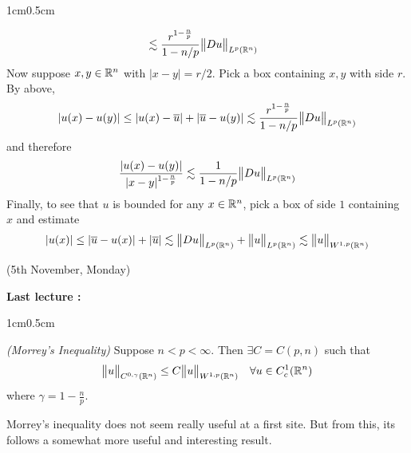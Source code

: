 \documentclass[12pt,a4paper]{report}
\newenvironment{proof}
{\begin{changemargin}{1cm}{0.5cm} 
	}%
	{\end{changemargin}
}
\begin{document}
\begin{proof}
\begin{align*}
&\lesssim \frac{r^{1-\frac{n}{p}}}{1-n/p} \bigl\lVert Du\bigr\rVert_{L^p(\mathbb{R}^n)}
\end{align*}
Now suppose $x,y\in \mathbb{R}^n$ with $|x-y| = r/2$. Pick a box containing $x,y$ with side $r$. By above,
\begin{align*}
|u(x) - u(y)| \leq |u(x)- \overline{u}| + |\overline{u} - u(y) | \lesssim \frac{r^{1-\frac{n}{p}}}{1-n/p} \bigl\lVert Du\bigr\rVert_{L^p(\mathbb{R}^n)}
\end{align*}
and therefore
\begin{align*}
\frac{|u(x)-u(y)|}{|x-y|^{1-\frac{n}{p}}} \lesssim \frac{1}{1-n/p} \bigl\lVert Du\bigr\rVert_{L^p(\mathbb{R}^n)}
\end{align*}
Finally, to see that $u$ is bounded for any $x\in \mathbb{R}^n$, pick a box of side $1$ containing $x$ and estimate
\begin{align*}
|u(x)| \leq |\overline{u}-u(x)| + |\overline{u}| \lesssim \bigl\lVert Du\bigr\rVert_{L^p(\mathbb{R}^n)} + \bigl\lVert u\bigr\rVert_{L^p(\mathbb{R}^n)} \lesssim \bigl\lVert u\bigr\rVert_{W^{1,p}(\mathbb{R}^n)}
\end{align*}

\eop
\end{proof}
\s

\newday

(5th November, Monday)
\s

\textbf{Last lecture :}
\begin{proof}
\thm \emph{(Morrey's Inequality)} Suppose $n<p<\infty$. Then $\exists C = C(p,n)$ such that
\begin{align*}
\bigl\lVert u\bigr\rVert_{C^{0,\gamma}(\mathbb{R}^n)} \leq C\bigl\lVert u\bigr\rVert_{W^{1,p}(\mathbb{R}^n)} \quad \forall u \in C_c^1(\mathbb{R}^n)
\end{align*}
where $\gamma = 1-\frac{n}{p}$.
\end{proof}
\s

Morrey's inequality does not seem really useful at a first site. But from this, its follows a somewhat more useful and interesting result.
\s
\end{document}
